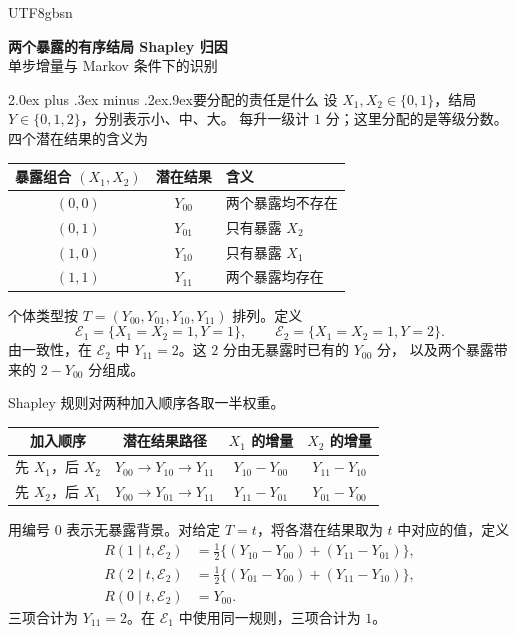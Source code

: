 \documentclass[11pt,a4paper]{article}
\makeatletter
\newcommand{\headingweight}{\ifPDFTeX\mdseries\else\bfseries\fi}
\renewcommand{\section}{\@startsection{section}{1}{0pt}
  {2.0ex plus .3ex minus .2ex}{.9ex}{\normalfont\large\headingweight}}
\makeatother
\begin{document}
\ifPDFTeX\begin{CJK*}{UTF8}{gbsn}\fi
\begin{center}
{\LARGE\headingweight 两个暴露的有序结局 Shapley 归因}\\[5pt]
{\large 单步增量与 Markov 条件下的识别}
\end{center}

\section{要分配的责任是什么}
设 $X_1,X_2\in\{0,1\}$，结局 $Y\in\{0,1,2\}$，分别表示小、中、大。
每升一级计 $1$ 分；这里分配的是等级分数。四个潜在结果的含义为
\begin{center}
\renewcommand{\arraystretch}{1.17}
\begin{tabular}{@{}c c l@{}}
\toprule
暴露组合 $(X_1,X_2)$ & 潜在结果 & 含义\\
\midrule
$(0,0)$ & $Y_{00}$ & 两个暴露均不存在\\
$(0,1)$ & $Y_{01}$ & 只有暴露 $X_2$\\
$(1,0)$ & $Y_{10}$ & 只有暴露 $X_1$\\
$(1,1)$ & $Y_{11}$ & 两个暴露均存在\\
\bottomrule
\end{tabular}
\end{center}
个体类型按 $T=(Y_{00},Y_{01},Y_{10},Y_{11})$ 排列。定义
\[
\mathcal E_1=\{X_1=X_2=1,Y=1\},\qquad
\mathcal E_2=\{X_1=X_2=1,Y=2\}.
\]
由一致性，在 $\mathcal E_2$ 中 $Y_{11}=2$。这 $2$ 分由无暴露时已有的 $Y_{00}$ 分，
以及两个暴露带来的 $2-Y_{00}$ 分组成。

\medskip
\noindent{\headingweight 给定类型的责任。}
Shapley 规则对两种加入顺序各取一半权重。
\begin{center}
\renewcommand{\arraystretch}{1.22}
\begin{tabular}{@{}c c c c@{}}
\toprule
加入顺序 & 潜在结果路径 & $X_1$ 的增量 & $X_2$ 的增量\\
\midrule
先 $X_1$，后 $X_2$ & $Y_{00}\to Y_{10}\to Y_{11}$
 & $Y_{10}-Y_{00}$ & $Y_{11}-Y_{10}$\\
先 $X_2$，后 $X_1$ & $Y_{00}\to Y_{01}\to Y_{11}$
 & $Y_{11}-Y_{01}$ & $Y_{01}-Y_{00}$\\
\bottomrule
\end{tabular}
\end{center}
用编号 $0$ 表示无暴露背景。对给定 $T=t$，将各潜在结果取为 $t$ 中对应的值，定义
\begin{equation}
\begin{aligned}
R(1\mid t,\mathcal E_2)&=\tfrac12\{(Y_{10}-Y_{00})+(Y_{11}-Y_{01})\},\\
R(2\mid t,\mathcal E_2)&=\tfrac12\{(Y_{01}-Y_{00})+(Y_{11}-Y_{10})\},\\
R(0\mid t,\mathcal E_2)&=Y_{00}.
\end{aligned}
\label{eq:individual}
\end{equation}
三项合计为 $Y_{11}=2$。在 $\mathcal E_1$ 中使用同一规则，三项合计为 $1$。


\end{CJK*}
\end{document}
